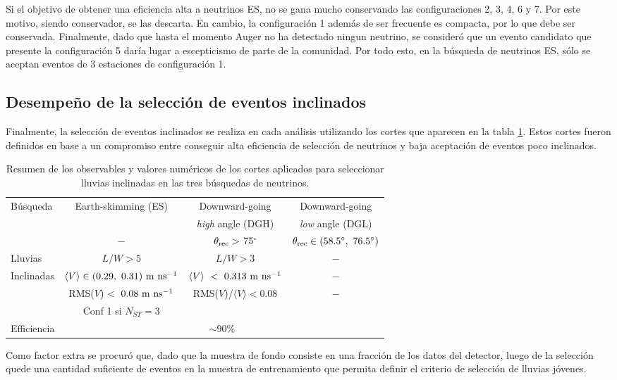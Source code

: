 		Si el objetivo de obtener una eficiencia alta a neutrinos ES, no se gana mucho conservando las configuraciones 2, 3, 4, 6 y 7. Por este motivo, siendo conservador, se las descarta.
		En cambio, la configuración 1 además de ser frecuente es compacta, por lo que debe ser conservada.
		Finalmente, dado que hasta el momento Auger no ha detectado ningun neutrino, se consideró que un evento candidato que presente la configuración 5 daría lugar a escepticismo de parte de la comunidad. Por todo esto, en la búsqueda de neutrinos ES, sólo se aceptan eventos de 3 estaciones de configuración 1.
		
		\subsection{Desempeño de la selección de eventos inclinados}
		
		Finalmente, la selección de eventos inclinados se realiza en cada análisis utilizando los cortes que aparecen en la tabla \ref{tab:inclSel}.
		Estos cortes fueron definidos en base a un compromiso entre conseguir alta eficiencia de selección de neutrinos y baja aceptación de eventos poco inclinados.
		\begin{table}[ht!]
		\begin{center}
			\renewcommand{\arraystretch}{1.4}
			\scriptsize
			\begin{tabular}{|l|c|c|c|}
			\hline
			Búsqueda & Earth-skimming (ES)           & Downward-going                        & Downward-going                       \\
					&                               & {\it high} angle (DGH)                & {\it low} angle (DGL)                \\
			\hline
						& $-$                             & $\theta_{\rm rec}>$ 75$^{\circ}$   &   $\theta_{\rm rec}\in (58.5^\circ,~76.5^{\circ})$\\
			Lluvias    & $L/W > 5$                                         & $L/W > 3$ & $-$ \\
			Inclinadas & $\langle V\rangle\in (0.29,~0.31)~{\rm m~ns^{-1}}$ & $\langle V \rangle~<~0.313~{\rm m~ns^{-1}}$ & $-$ \\
					& RMS($V$)$~<~0.08~{\rm m~ns^{-1}}$                 & RMS($V$)/$\langle V\rangle<0.08$ & $-$ \\
					& Conf 1 si $N_{ST}=3$ & & \\
			\hline
			Efficiencia & \multicolumn{3}{c|}{$\sim90\%$}\\
			\hline
			\end{tabular}
			\vskip -3mm
			\caption{Resumen de los observables y valores numéricos de los cortes aplicados para seleccionar lluvias inclinadas en las tres búsquedas de neutrinos.} 
		\end{center}

		\label{tab:inclSel}
		\end{table}
		Como factor extra se procur\'o que, dado que la muestra de fondo consiste en una fracción de los datos del detector, luego de la selección quede una cantidad suficiente de eventos en la muestra de entrenamiento que permita definir el criterio de selección de lluvias jóvenes.
		
